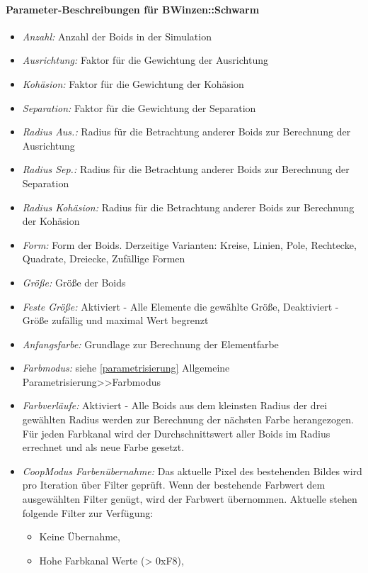 \documentclass[../mciAusarbeitung.tex]{subfiles}
\begin{document}
\paragraph{Parameter-Beschreibungen für BWinzen::Schwarm}
\begin{itemize}
	\setlength\itemsep{-0.1em}
	\item\textit{Anzahl:} Anzahl der Boids in der Simulation
	\item\textit{Ausrichtung:} Faktor für die Gewichtung der Ausrichtung
	\item\textit{Kohäsion:} Faktor für die Gewichtung der Kohäsion 
	\item\textit{Separation:} Faktor für die Gewichtung der Separation 
	\item\textit{Radius Aus.:} Radius für die Betrachtung anderer Boids zur Berechnung der Ausrichtung
	\item\textit{Radius Sep.:} Radius für die Betrachtung anderer Boids zur Berechnung der Separation
	\item\textit{Radius Kohäsion:} Radius für die Betrachtung anderer Boids zur Berechnung der Kohäsion
	\item\textit{Form:} Form der Boids. Derzeitige Varianten: {Kreise, Linien, Pole, Rechtecke, Quadrate, Dreiecke, Zufällige Formen}
	\item\textit{Größe:} Größe der Boids
	\item\textit{Feste Größe:} Aktiviert - Alle Elemente die gewählte Größe, Deaktiviert - Größe zufällig und maximal Wert begrenzt
	\item\textit{Anfangsfarbe:} Grundlage zur Berechnung der Elementfarbe 
	\item\textit{Farbmodus:} siehe \ref{parametrisierung} Allgemeine Parametrisierung>>Farbmodus
	\item\textit{Farbverläufe:} Aktiviert -  Alle Boids aus dem kleinsten Radius der drei gewählten Radius werden zur Berechnung der nächsten Farbe herangezogen. Für jeden Farbkanal wird der Durchschnittswert aller Boids im Radius errechnet und als neue Farbe gesetzt.
	\item\textit{CoopModus Farbenübernahme:} Das aktuelle Pixel des bestehenden Bildes wird pro Iteration über Filter geprüft. Wenn der bestehende Farbwert dem ausgewählten Filter genügt, wird der Farbwert übernommen. Aktuelle stehen folgende Filter zur Verfügung:
		\begin{itemize}
		\setlength\itemsep{-0.1em}
			\item Keine Übernahme,
			\item Hohe Farbkanal Werte (> 0xF8),

\end{itemize}
\end{itemize}
\end{document}
